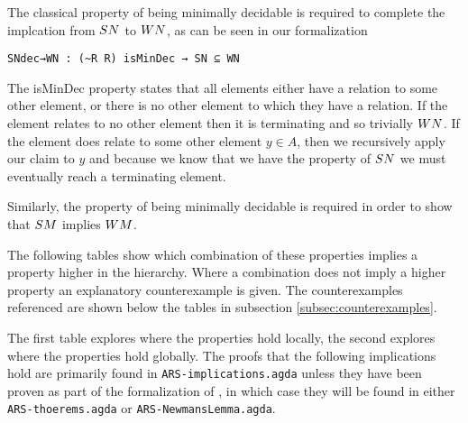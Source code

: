 The classical property of being minimally decidable is required to complete the implcation 
from $\SN$ to $\WN$, as can be seen in our formalization

\verb|SNdec→WN : (~R R) isMinDec → SN ⊆ WN| \footnotemark[1]


The isMinDec property states that all elements either have a relation to some other element, or 
there is no other element to which they have a relation. If the element relates to no other element then it is terminating 
and so trivially $\WN$. If the element does relate to some other element $y \in A$, then we recursively apply our claim to 
$y$ and because we know that we have the property of $\SN$ we must eventually reach a terminating element. 

Similarly, the property of being minimally decidable is required in order to show that $\SM$ implies $\WM$.

The following tables show which combination of these properties implies a property higher in the hierarchy. Where a combination 
does not imply a higher property an explanatory counterexample is given. The counterexamples referenced are shown below the tables in subsection \ref{subsec:counterexamples}. 

The first table explores where the properties hold locally, the second explores where the properties hold globally. The proofs that the 
following implications hold are primarily found in \texttt{ARS-implications.agda} unless they have been proven as part of the formalization 
of \terese, in which case they will be found in either \texttt{ARS-thoerems.agda} or \texttt{ARS-NewmansLemma.agda}.

